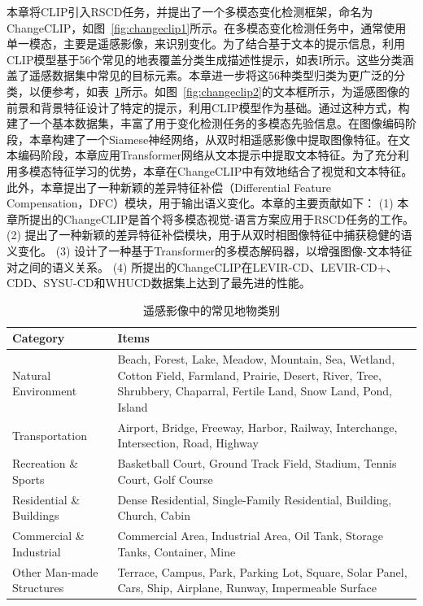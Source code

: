 本章将CLIP引入RSCD任务，并提出了一个多模态变化检测框架，命名为ChangeCLIP，如图~\ref{fig:changeclip1}所示。在多模态变化检测任务中，通常使用单一模态，主要是遥感影像，来识别变化。为了结合基于文本的提示信息，利用CLIP模型基于56个常见的地表覆盖分类生成描述性提示，如表I所示。这些分类涵盖了遥感数据集中常见的目标元素。本章进一步将这56种类型归类为更广泛的分类，以便参考，如表~\ref{tab:remote_sensing_categories}所示。如图~\ref{fig:changeclip2}的文本框所示，为遥感图像的前景和背景特征设计了特定的提示，利用CLIP模型作为基础。通过这种方式，构建了一个基本数据集，丰富了用于变化检测任务的多模态先验信息。在图像编码阶段，本章构建了一个Siamese神经网络，从双时相遥感影像中提取图像特征。在文本编码阶段，本章应用Transformer网络从文本提示中提取文本特征。为了充分利用多模态特征学习的优势，本章在ChangeCLIP中有效地结合了视觉和文本特征。此外，本章提出了一种新颖的差异特征补偿（Differential Feature Compensation，DFC）模块，用于输出语义变化。本章的主要贡献如下： (1) 本章所提出的ChangeCLIP是首个将多模态视觉-语言方案应用于RSCD任务的工作。 (2) 提出了一种新颖的差异特征补偿模块，用于从双时相图像特征中捕获稳健的语义变化。 (3) 设计了一种基于Transformer的多模态解码器，以增强图像-文本特征对之间的语义关系。 (4) 所提出的ChangeCLIP在LEVIR-CD、LEVIR-CD+、CDD、SYSU-CD和WHUCD数据集上达到了最先进的性能。


\begin{table}[!htbp]
  \centering
  \caption{遥感影像中的常见地物类别}
  \label{tab:remote_sensing_categories}
  \begin{tabularx}{\linewidth}{@{}l X@{}}
    \toprule
    Category                      & Items \\
    \midrule
    Natural Environment           & Beach, Forest, Lake, Meadow, Mountain, Sea, Wetland, Cotton Field, Farmland, Prairie, Desert, River, Tree, Shrubbery, Chaparral, Fertile Land, Snow Land, Pond, Island \\
    \midrule
    Transportation                & Airport, Bridge, Freeway, Harbor, Railway, Interchange, Intersection, Road, Highway \\
    \midrule
    Recreation \& Sports          & Basketball Court, Ground Track Field, Stadium, Tennis Court, Golf Course \\
    \midrule
    Residential \& Buildings      & Dense Residential, Single-Family Residential, Building, Church, Cabin \\
    \midrule
    Commercial \& Industrial      & Commercial Area, Industrial Area, Oil Tank, Storage Tanks, Container, Mine \\
    \midrule
    Other Man-made Structures     & Terrace, Campus, Park, Parking Lot, Square, Solar Panel, Cars, Ship, Airplane, Runway, Impermeable Surface \\
    \bottomrule
  \end{tabularx}
\end{table}


